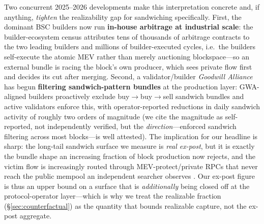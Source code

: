 \documentclass[11pt]{article}
\begin{document}
Two concurrent 2025--2026 developments make this interpretation concrete and, if
anything, \emph{tighten} the realizability gap for sandwiching specifically. First, the
dominant BSC builders now run \textbf{in-house arbitrage at industrial scale}: the
builder-ecosystem census \cite{wang2025binance} attributes tens of thousands of
arbitrage contracts to the two leading builders and millions of builder-executed
cycles, i.e.\ the builders self-execute the atomic MEV rather than merely auctioning
blockspace---so an external bundle is racing the block's own producer, which sees
private flow first and decides its cut after merging. Second, a validator/builder
\emph{Goodwill Alliance} has begun \textbf{filtering sandwich-pattern bundles} at the
production layer: GWA-aligned builders proactively exclude buy$\to$buy$\to$sell
sandwich bundles and active validators enforce this, with operator-reported reductions
in daily sandwich activity of roughly two orders of magnitude \cite{bnbchain2025gwa}
(we cite the magnitude as self-reported, not independently verified, but the
\emph{direction}---enforced sandwich filtering across most blocks---is well attested).
The implication for our headline is sharp: the long-tail sandwich surface we measure is
\emph{real ex-post}, but it is exactly the bundle shape an increasing fraction of block
production now rejects, and the victim flow is increasingly routed through
MEV-protect/private RPCs that never reach the public mempool an independent searcher
observes \cite{blocksec2025pbs}. Our ex-post figure is thus an upper bound on a surface
that is \emph{additionally} being closed off at the protocol-operator layer---which is
why we treat the realizable fraction (\S\ref{sec:counterfactual}) as the quantity that
bounds realizable capture, not the ex-post aggregate.
\end{document}
